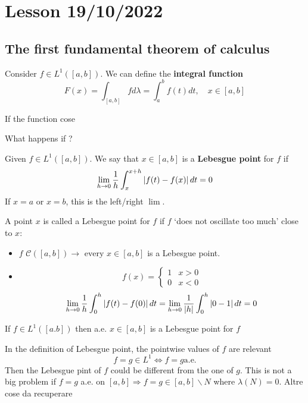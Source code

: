 \section{Lesson 19/10/2022}
\subsection*{The first fundamental theorem of calculus}

Consider \(f \in L^1\left([a,b]\right)\). We can define the \textbf{integral function}
\[F(x) = \int_{[a,b]} f d\lambda = \int_a^b f(t)dt , \quad x \in [a,b]\]

If the function cose 

What happens if ?

\begin{definition}
    Given \(f \in L^1([a,b])\). We say that \(x \in [a,b]\) is a \textbf{Lebesgue point} for \(f\) if 
    \[
        \lim_{h \to 0} \frac{1}{h} \int_x^{x+h} \abs{f(t) - f(x)} \, dt = 0
    \]
    If \(x=a\) or \(x=b\), this is the left/right \(\lim\).
\end{definition}
\begin{remark}
    A point \(x\) is called a Lebesgue point for \(f\) if \(f\) `does not oscillate too much' close to \(x\):
    \begin{itemize}
        \item \(f\) \(\mathcal{C}([a,b]) \to \text{ every } x \in [a,b]\) is a Lebesgue point.
        \item \[
            f(x) = \begin{cases}
                1  & x > 0 \\
            0 & x < 0
            \end{cases}
        \]
        \[
            \lim_{h \to 0} \frac{1}{h} \int_0^{h} \abs{f(t) - f(0)} \, dt = \lim_{h \to 0} \frac{1}{\abs{h}} \int_0^{h} \abs{0 - 1} \, dt = 0
        \]
    \end{itemize}
\end{remark}
\begin{theorem}
    If \(f \in L^1([a.b])\) then a.e. \(x \in [a,b]\) is a Lebesgue point for \(f\)
\end{theorem}
\begin{remark}
    In the definition of Lebesgue point, the pointwise values of \(f\) are relevant 
    \[
        f = g \in L^1 \Longleftrightarrow f = g \text{a.e.}
    \]
    Then the Lebesgue pint of \(f\) could be different from the one of \(g\).  
    This is not a big problem if \(f = g\) a.e. on \([a,b] \Longrightarrow f = g \in [a,b]\backslash N\) where \(\lambda(N) = 0\). Altre cose da recuperare
\end{remark}
